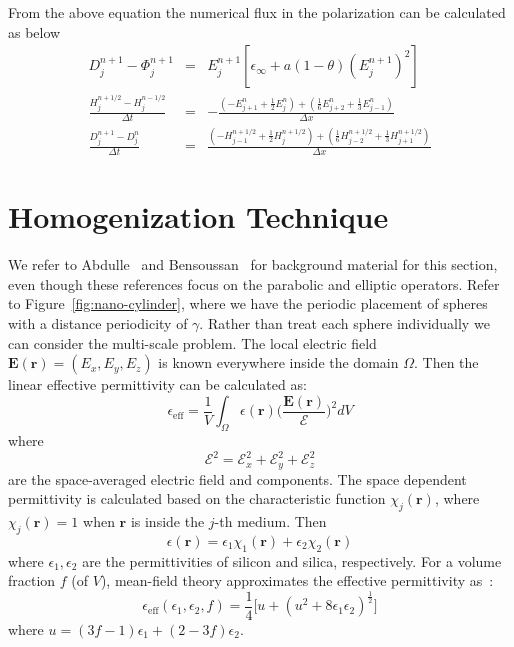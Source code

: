 \documentclass{article}[12pt]
\theoremstyle{plain}
\begin{document}
From the above equation the numerical flux in the polarization can be calculated as below
\begin{eqnarray}
  D_j^{n+1} - \Phi_j^{n+1} & = & E_j^{n+1}[\epsilon_\infty + a(1-\theta)(E_j^{n+1})^2] \\
  \frac{H_j^{n+1/2}-H_j^{n-1/2}}{\Delta t} & = & - \frac{ (-E_{j+1}^n + \frac{1}{2} E_j^n) +
    (\frac{1}{6}E_{j+2}^n + \frac{1}{3}E_{j-1}^n) }{\Delta x} \\
  \frac{D_j^{n+1}-D_j^n}{\Delta t} & = & \frac{ (-H_{j-1}^{n+1/2}+\frac{1}{2}H_j^{n+1/2}) +
    (\frac{1}{6}H_{j-2}^{n+1/2} + \frac{1}{3}H_{j+1}^{n+1/2})  }{\Delta x} \label{eqn:numerical-flux}
  \end{eqnarray}

\section{Homogenization Technique}
\label{section:homogenization}
We refer to Abdulle~\cite{abdulle2003finite} and Bensoussan~\cite{bensoussan2011asymptotic} for
background material for this section, even though these references focus on the parabolic and
elliptic operators. Refer to Figure~\ref{fig:nano-cylinder}, where we have the periodic placement
of spheres with a distance periodicity of $\gamma$. Rather than treat each sphere individually
we can consider the multi-scale problem. The local electric field $\mathbf{E(r)}=(E_x,E_y,E_z)$ is
known everywhere inside the domain $\Omega$. Then the linear effective permittivity can be calculated
as:
\begin{equation}
  \epsilon_\mathrm{eff} = \frac{1}{V} \int_\Omega \epsilon(\mathbf{r})\Big(
  \frac{\mathbf{E(r)}}{\mathcal{E}}\Big)^2 dV
\end{equation}
where
\[
\mathcal{E}^2 = \mathcal{E}_x^2 + \mathcal{E}_y^2 + \mathcal{E}_z^2
\]
are the space-averaged electric field and components.
The space dependent permittivity is calculated based on the characteristic function $\chi_j(\mathbf{r})$,
where $\chi_j(\mathbf{r})=1$ when $\mathbf{r}$ is inside the $j$-th medium. Then
\[
\epsilon(\mathbf{r}) = \epsilon_1 \chi_1(\mathbf{r}) + \epsilon_2 \chi_2(\mathbf{r})
\]
where $\epsilon_1,\epsilon_2$ are the permittivities of silicon and silica, respectively.
For a volume fraction $f$ (of $V$), mean-field theory approximates the effective permittivity
as~\cite{rukhlenko2012effective}:
\begin{equation}
  \epsilon_\mathrm{eff}(\epsilon_1,\epsilon_2,f) = \frac{1}{4}
  \Big[ u + (u^2+8\epsilon_1\epsilon_2)^\frac{1}{2}\Big] \label{eqn:mft}
\end{equation}
where $u=(3f-1)\epsilon_1 + (2-3f)\epsilon_2$.
\end{document}
